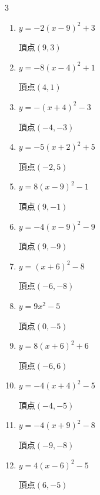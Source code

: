 \begin{multicols}{3}
\begin{enumerate}
  \item $\displaystyle y=-2\left( x-9\right)^{2}+3$

        $\displaystyle 頂点\left( 9 , 3 \right)$

  \item $\displaystyle y=-8\left( x-4\right)^{2}+1$

        $\displaystyle 頂点\left( 4 , 1 \right)$

  \item $\displaystyle y=-\left( x+4\right)^{2}-3$

        $\displaystyle 頂点\left( -4 , -3 \right)$

  \item $\displaystyle y=-5\left( x+2\right)^{2}+5$

        $\displaystyle 頂点\left( -2 , 5 \right)$

  \item $\displaystyle y=8\left( x-9\right)^{2}-1$

        $\displaystyle 頂点\left( 9 , -1 \right)$

  \item $\displaystyle y=-4\left( x-9\right)^{2}-9$

        $\displaystyle 頂点\left( 9 , -9 \right)$

  \item $\displaystyle y=\left( x+6\right)^{2}-8$

        $\displaystyle 頂点\left( -6 , -8 \right)$

  \item $\displaystyle y=9x^{2}-5$

        $\displaystyle 頂点\left( 0 , -5 \right)$

  \item $\displaystyle y=8\left( x+6\right)^{2}+6$

        $\displaystyle 頂点\left( -6 , 6 \right)$

  \item $\displaystyle y=-4\left( x+4\right)^{2}-5$

        $\displaystyle 頂点\left( -4 , -5 \right)$

  \item $\displaystyle y=-4\left( x+9\right)^{2}-8$

        $\displaystyle 頂点\left( -9 , -8 \right)$

  \item $\displaystyle y=4\left( x-6\right)^{2}-5$

        $\displaystyle 頂点\left( 6 , -5 \right)$


\end{enumerate}
\end{multicols}
